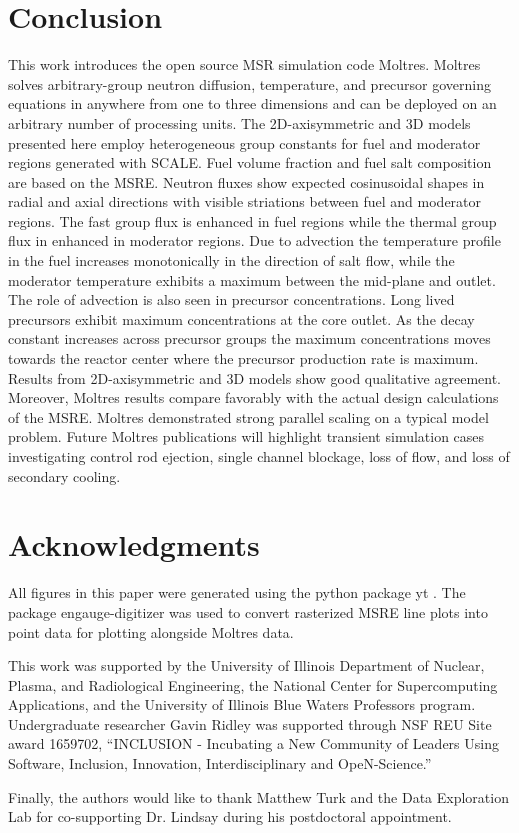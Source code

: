 \documentclass{article}
\let\Oldsection\section
\renewcommand{\section}{\FloatBarrier\Oldsection}
\begin{document}
\section{Conclusion}

This work introduces the open source \gls{MSR} simulation code Moltres. Moltres
solves arbitrary-group neutron diffusion, temperature, and precursor governing
equations in anywhere from one to three dimensions and can be deployed on an
arbitrary number of processing units. The 2D-axisymmetric and 3D models
presented here employ heterogeneous group constants for fuel and moderator
regions generated with SCALE. Fuel volume fraction and fuel salt composition are
based on the \gls{MSRE}. Neutron fluxes show expected cosinusoidal shapes in
radial and axial directions with visible striations between fuel and moderator
regions. The fast group flux is enhanced in fuel regions while the thermal group
flux in enhanced in moderator regions. Due to advection the temperature profile
in the fuel increases monotonically in the direction of salt flow, while the
moderator temperature exhibits a maximum between the mid-plane and outlet. The
role of advection is also seen in precursor concentrations. Long lived
precursors exhibit maximum concentrations at the core outlet. As the decay
constant increases across precursor groups the maximum concentrations moves
towards the reactor center where the precursor production rate is
maximum. Results from 2D-axisymmetric and 3D models show good qualitative
agreement. Moreover, Moltres results compare favorably with the actual design
calculations of the \gls{MSRE}. Moltres demonstrated strong parallel scaling on a
typical model problem. Future Moltres publications will highlight
transient simulation cases investigating control rod ejection, single channel
blockage, loss of flow, and loss of secondary cooling.

\FloatBarrier

\section{Acknowledgments}

All figures in this paper were generated using the python package yt
\cite{turk_yt:_2011}. The package engauge-digitizer
\cite{mark_mitchell_markummitchell/engauge-digitizer:_2017} was used to convert
rasterized \gls{MSRE} line plots into point data for plotting alongside Moltres
data.

This work was supported by the University of Illinois Department of Nuclear, 
Plasma, and Radiological Engineering, the National Center for Supercomputing 
Applications, and the University of Illinois Blue Waters Professors program. 
Undergraduate researcher Gavin Ridley was supported through NSF REU Site award 
1659702, ``INCLUSION - Incubating a New Community of Leaders Using Software, 
Inclusion, Innovation, Interdisciplinary and OpeN-Science.''

Finally, the authors would like to thank Matthew Turk and the Data Exploration 
Lab for co-supporting Dr. Lindsay during his postdoctoral appointment.

\clearpage
\printglossary[type=\acronymtype]


\end{document}
